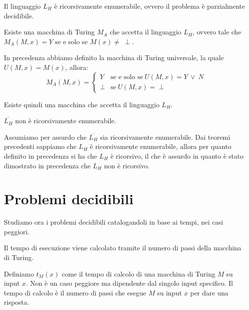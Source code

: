\begin{teorema}
    Il linguaggio $L_H$ è ricorsivamente enumerabile, ovvero il problema è parzialmente decidibile.
\end{teorema}
\begin{dimostrazione}
    Esiste una macchina di Turing $M_A$ che accetta il linguaggio $L_H$, ovvero tale che $M_A(M, x) = Y$ se e solo se $M(x) \neq \ \perp$. 

    In precedenza abbiamo definito la macchina di Turing universale, la quale $U(M, x) = M(x)$, allora:
    \begin{equation}
        M_A(M, x) = \begin{cases}
            Y & \text{se e solo se} \ U(M, x) = Y \ \lor \ N \\
            \perp & \text{se} \ U(M, x) = \perp
        \end{cases}
    \end{equation}

    Esiste quindi una macchina che accetta il linguaggio $L_H$.
\end{dimostrazione}
\begin{teorema}
    $\overline{L_H}$ non è ricorsivamente enumerabile.
\end{teorema}
\begin{dimostrazione} 
    Assumiamo per assurdo che $\overline{L_H}$ sia ricorsivamente enumerabile. Dai teoremi precedenti sappiamo che $L_H$ è ricorsivamente enumerabile, allora per quanto definito in precedenza si ha che $L_H$ è ricorsivo, il che è assurdo in quanto è stato dimostrato in precedenza che $L_H$ non è ricorsivo.
\end{dimostrazione}
\section{Problemi decidibili}
Studiamo ora i problemi decidibili catalogandoli in base ai tempi, nei casi peggiori.

Il tempo di esecuzione viene calcolato tramite il numero di passi della macchina di Turing.
\begin{definizione}
     Definiamo $t_M(x)$ come il tempo di calcolo di una macchina di Turing $M$ su input $x$. Non è un caso peggiore ma dipendente dal singolo input specifico. Il tempo di calcolo è il numero di passi che esegue $M$ su input $x$ per dare una risposta.
\end{definizione}

